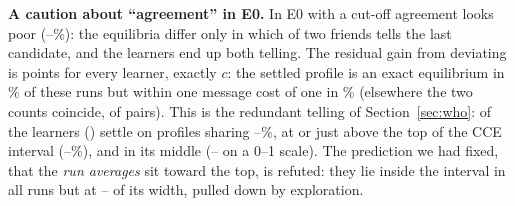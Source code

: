 \documentclass[conference]{IEEEtran}
\theoremstyle{plain}
\theoremstyle{definition}\newtheorem{definition}{Definition}
\newcommand{\finding}[1]{\textbf{#1}}
\begin{document}
\finding{A caution about ``agreement'' in E0.} In E0 with a cut-off agreement looks poor (\AgreeEzeroBarMin--\AgreeEzeroBarMax\%): the \NumEqEzeroBar{} equilibria differ only in which of two friends tells the last
candidate, and the learners end up both telling. The residual gain from deviating is \ExplEzeroBarMin{} points for every learner, exactly $c$: the settled profile is an exact equilibrium in \ExactEzeroBarMax\% of these runs but within one
message cost of one in \WithinCEzeroBarMin\% (elsewhere the two counts coincide, \WithinCOtherSame{} of \WithinCOtherTot{} pairs). This is the redundant telling of Section~\ref{sec:who}: \LcSettledHighN{} of the \LcSettledN{} learners
(\LcSettledHighNames) settle on profiles sharing \LcSettledHighShareMin--\LcSettledHighShareMax\%, at or just above the top of the CCE interval (\CceExLo--\CceExHi\%), and \LcSettledLowNames{} in its middle (\LcSettledLowPosMin--\LcSettledLowPosMax{} on a 0--1 scale).
The prediction we had fixed, that the \emph{run averages} sit toward the top, is refuted: they lie inside the interval in all \LcRunN{} runs but at \LcRunPosMin--\LcRunPosMax{} of its width, pulled down by exploration.
\end{document}
